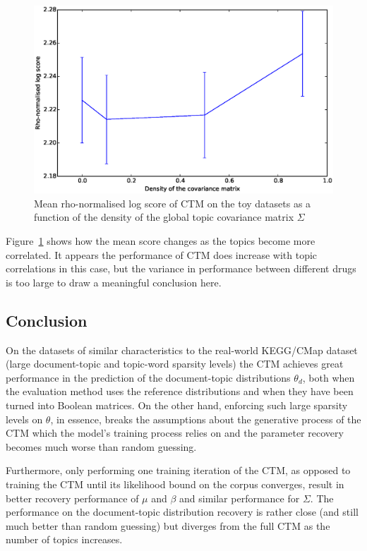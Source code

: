 \documentclass[12pt,a4paper,twoside,openright]{report}
\begin{document}
\begin{figure}[!htb]
\includegraphics[width=\textwidth]{sim-sigmadensity-rho.eps}
\caption{Mean rho-normalised log score of CTM on the toy datasets as a function of the density of the global topic covariance matrix $\Sigma$}
\label{fig:sim-sigmadensity-rho}
\end{figure}

Figure~\ref{fig:sim-sigmadensity-rho} shows how the mean score changes as the topics become more correlated. It appears the performance of CTM does increase with topic correlations in this case, but the variance in performance between different drugs is too large to draw a meaningful conclusion here.

\subsection{Conclusion}

On the datasets of similar characteristics to the real-world KEGG/CMap dataset (large document-topic and topic-word sparsity levels) the CTM achieves great performance in the prediction of the document-topic distributions $\theta_d$, both when the evaluation method uses the reference distributions and when they have been turned into Boolean matrices. On the other hand, enforcing such large sparsity levels on $\theta$, in essence, breaks the assumptions about the generative process of the CTM which the model's training process relies on and the parameter recovery becomes much worse than random guessing.

Furthermore, only performing one training iteration of the CTM, as opposed to training the CTM until its likelihood bound on the corpus converges, result in better recovery performance of $\mu$ and $\beta$ and similar performance for $\Sigma$. The performance on the document-topic distribution recovery is rather close (and still much better than random guessing) but diverges from the full CTM as the number of topics increases.
\end{document}
